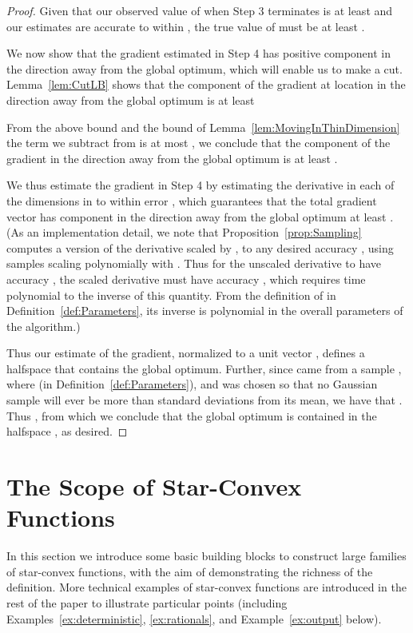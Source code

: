 \documentclass[11pt,letter]{article}
\numberwithin{nTheorems}{section}
\begin{document}
\begin{proof}
Given that our observed value of  when Step 3 terminates is at least  and our estimates are accurate to within , the true value of  must be at least .

We now show that the gradient  estimated in Step 4 has positive component in the direction away from the global optimum, which will enable us to make a cut. Lemma~\ref{lem:CutLB} shows that the component of the gradient at location  in the direction away from the global optimum is at least 

From the above bound  and the bound of Lemma~\ref{lem:MovingInThinDimension} the term we subtract from  is at most , we conclude that the component of the gradient in the direction away from the global optimum is at least .

We thus estimate the gradient in Step 4 by estimating the derivative in each of the dimensions in  to within error , which guarantees that the total gradient vector has component in the direction away from the global optimum at least . (As an implementation detail, we note that Proposition~\ref{prop:Sampling} computes a version of the derivative scaled by , to any desired accuracy , using samples scaling polynomially with . Thus for the unscaled derivative to have accuracy , the scaled derivative must have accuracy , which requires time polynomial to the inverse of this quantity. From the definition of  in Definition~\ref{def:Parameters}, its inverse is polynomial in the overall parameters of the algorithm.)

Thus our estimate of the gradient, normalized to a unit vector , defines a halfspace  that contains the global optimum. Further, since  came from a sample , where  (in Definition~\ref{def:Parameters}), and  was chosen so that no Gaussian sample will ever be more than  standard deviations from its mean, we have that . Thus , from which we conclude that the global optimum is contained in the halfspace , as desired.


\end{proof}






\newpage
\appendix
\section{The Scope of Star-Convex Functions}\label{sec:examples}
In this section we introduce some basic building blocks to construct large families of star-convex functions, with the aim of demonstrating the richness of the definition. More technical examples of star-convex functions are introduced in the rest of the paper to illustrate particular points (including Examples~\ref{ex:deterministic}, \ref{ex:rationals}, and Example~\ref{ex:output} below).
\end{document}
